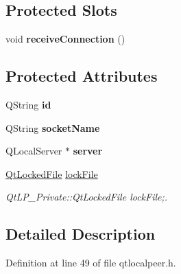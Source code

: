 \subsection*{Protected Slots}
\begin{DoxyCompactItemize}
\item 
\hypertarget{class_qt_local_peer_afb29397e8af380cac78af0b7535121d2}{
void {\bfseries receiveConnection} ()}
\label{class_qt_local_peer_afb29397e8af380cac78af0b7535121d2}

\end{DoxyCompactItemize}
\subsection*{Protected Attributes}
\begin{DoxyCompactItemize}
\item 
\hypertarget{class_qt_local_peer_a89ee3139c0e2515e081a2b5de98beda6}{
QString {\bfseries id}}
\label{class_qt_local_peer_a89ee3139c0e2515e081a2b5de98beda6}

\item 
\hypertarget{class_qt_local_peer_a2c86a18c237bdfe4bd0565d3cc413cd8}{
QString {\bfseries socketName}}
\label{class_qt_local_peer_a2c86a18c237bdfe4bd0565d3cc413cd8}

\item 
\hypertarget{class_qt_local_peer_af400ab8eb001ef4790541069a5d0e292}{
QLocalServer $\ast$ {\bfseries server}}
\label{class_qt_local_peer_af400ab8eb001ef4790541069a5d0e292}

\item 
\hypertarget{class_qt_local_peer_ab72488160eed35c9518ef3de1e6062cf}{
\hyperlink{class_qt_locked_file}{QtLockedFile} \hyperlink{class_qt_local_peer_ab72488160eed35c9518ef3de1e6062cf}{lockFile}}
\label{class_qt_local_peer_ab72488160eed35c9518ef3de1e6062cf}

\begin{DoxyCompactList}\small\item\em QtLP\_\-Private::QtLockedFile lockFile;. \end{DoxyCompactList}\end{DoxyCompactItemize}


\subsection{Detailed Description}


Definition at line 49 of file qtlocalpeer.h.




